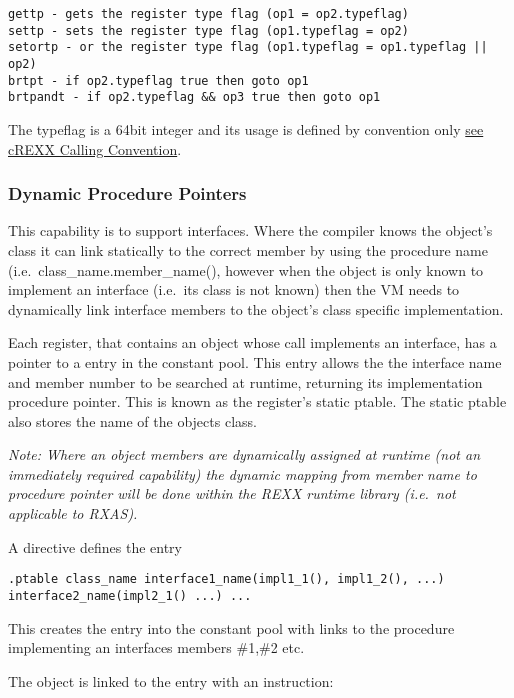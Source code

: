 \begin{verbatim}
gettp - gets the register type flag (op1 = op2.typeflag)
settp - sets the register type flag (op1.typeflag = op2)
setortp - or the register type flag (op1.typeflag = op1.typeflag || op2)
brtpt - if op2.typeflag true then goto op1
brtpandt - if op2.typeflag && op3 true then goto op1
\end{verbatim}

The typeflag is a 64bit integer and its usage is defined by convention
only \protect\hyperlink{crexx-calling-convention}{see cREXX Calling
Convention}.

\hypertarget{dynamic-procedure-pointers}{%
\subsubsection{Dynamic Procedure
Pointers}\label{dynamic-procedure-pointers}}

This capability is to support interfaces. Where the compiler knows the
object's class it can link statically to the correct member by using the
procedure name (i.e.~class\_name.member\_name(), however when the object
is only known to implement an interface (i.e.~its class is not known)
then the VM needs to dynamically link interface members to the object's
class specific implementation.

Each register, that contains an object whose call implements an
interface, has a pointer to a entry in the constant pool. This entry
allows the the interface name and member number to be searched at
runtime, returning its implementation procedure pointer. This is known
as the register's static ptable. The static ptable also stores the name
of the objects class.

\emph{Note: Where an object members are dynamically assigned at runtime
(not an immediately required capability) the dynamic mapping from member
name to procedure pointer will be done within the REXX runtime library
(i.e.~not applicable to RXAS).}

A directive defines the entry

\begin{verbatim}
.ptable class_name interface1_name(impl1_1(), impl1_2(), ...) interface2_name(impl2_1() ...) ...
\end{verbatim}

This creates the entry into the constant pool with links to the
procedure implementing an interfaces members \#1,\#2 etc.

The object is linked to the entry with an instruction:

